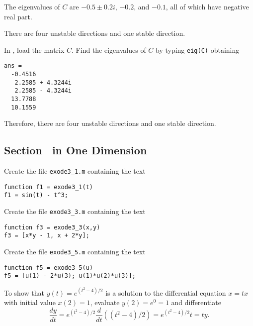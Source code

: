 \soln The eigenvalues of $C$ are $-0.5 \pm 0.2i$, $-0.2$, and $-0.1$, all
of which have negative real part.

 \ans There are four unstable directions and one stable 
direction.

\soln  In \Matlabp, load the matrix $C$.  Find the eigenvalues of $C$ by
typing {\tt eig(C)} obtaining
\begin{verbatim}
ans =
  -0.4516          
   2.2585 + 4.3244i
   2.2585 - 4.3244i
  13.7788          
  10.1559   
\end{verbatim}
Therefore, there are four unstable directions and one stable direction.



\subsection*{Section~\protect{\ref{S:ode45}}  in One Dimension}

Create the file {\tt exode3\_1.m} containing the text
\begin{verbatim}
function f1 = exode3_1(t)
f1 = sin(t) - t^3;
\end{verbatim}

Create the file {\tt exode3\_3.m} containing the text
\begin{verbatim}
function f3 = exode3_3(x,y)
f3 = [x*y - 1, x + 2*y];
\end{verbatim}

Create the file {\tt exode3\_5.m} containing the text
\begin{verbatim}
function f5 = exode3_5(u)
f5 = [u(1) - 2*u(3); u(1)*u(2)*u(3)];
\end{verbatim}

To show that $y(t)=e^{(t^2-4)/2}$ is a solution to the differential equation
$\dot{x}=tx$ with initial value $x(2)=1$, evaluate $y(2)=e^0=1$ and
differentiate
\[
\frac{dy}{dt} = e^{(t^2-4)/2}\frac{d}{dt}((t^2-4)/2) = 
e^{(t^2-4)/2}t = ty.
\]

